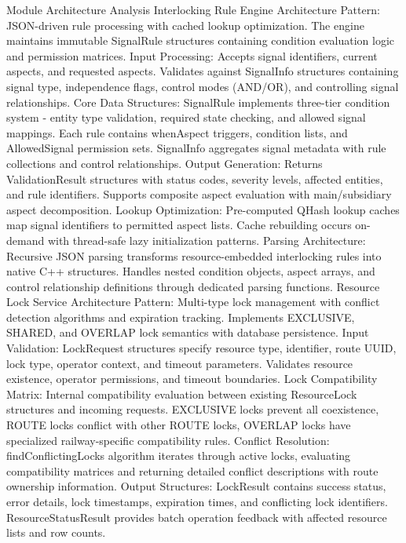 Module Architecture Analysis
Interlocking Rule Engine
Architecture Pattern: JSON-driven rule processing with cached lookup optimization. The engine maintains immutable SignalRule structures containing condition evaluation logic and permission matrices.
Input Processing: Accepts signal identifiers, current aspects, and requested aspects. Validates against SignalInfo structures containing signal type, independence flags, control modes (AND/OR), and controlling signal relationships.
Core Data Structures: SignalRule implements three-tier condition system - entity type validation, required state checking, and allowed signal mappings. Each rule contains whenAspect triggers, condition lists, and AllowedSignal permission sets. SignalInfo aggregates signal metadata with rule collections and control relationships.
Output Generation: Returns ValidationResult structures with status codes, severity levels, affected entities, and rule identifiers. Supports composite aspect evaluation with main/subsidiary aspect decomposition.
Lookup Optimization: Pre-computed QHash lookup caches map signal identifiers to permitted aspect lists. Cache rebuilding occurs on-demand with thread-safe lazy initialization patterns.
Parsing Architecture: Recursive JSON parsing transforms resource-embedded interlocking rules into native C++ structures. Handles nested condition objects, aspect arrays, and control relationship definitions through dedicated parsing functions.
Resource Lock Service
Architecture Pattern: Multi-type lock management with conflict detection algorithms and expiration tracking. Implements EXCLUSIVE, SHARED, and OVERLAP lock semantics with database persistence.
Input Validation: LockRequest structures specify resource type, identifier, route UUID, lock type, operator context, and timeout parameters. Validates resource existence, operator permissions, and timeout boundaries.
Lock Compatibility Matrix: Internal compatibility evaluation between existing ResourceLock structures and incoming requests. EXCLUSIVE locks prevent all coexistence, ROUTE locks conflict with other ROUTE locks, OVERLAP locks have specialized railway-specific compatibility rules.
Conflict Resolution: findConflictingLocks algorithm iterates through active locks, evaluating compatibility matrices and returning detailed conflict descriptions with route ownership information.
Output Structures: LockResult contains success status, error details, lock timestamps, expiration times, and conflicting lock identifiers. ResourceStatusResult provides batch operation feedback with affected resource lists and row counts.
